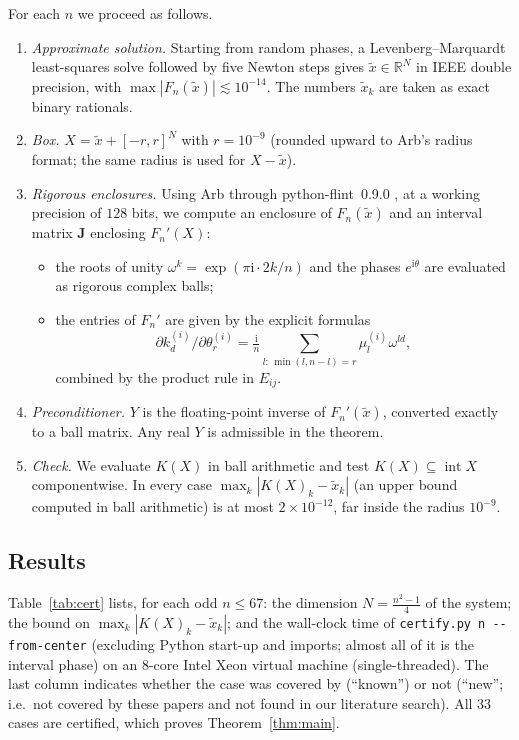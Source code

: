 \documentclass[11pt]{amsart}
\theoremstyle{definition}
\theoremstyle{remark}
\newcommand{\R}{\mathbb{R}}
\begin{document}
For each $n$ we proceed as follows.
\begin{enumerate}
\item \emph{Approximate solution.} Starting from random phases, a Levenberg--Marquardt least-squares solve followed by five Newton steps gives $\tilde x\in\R^N$ in IEEE double precision, with $\max|F_n(\tilde x)|\lesssim10^{-14}$. The numbers $\tilde x_k$ are taken as exact binary rationals.
\item \emph{Box.} $X=\tilde x+[-r,r]^N$ with $r=10^{-9}$ (rounded upward to Arb's radius format; the same radius is used for $X-\tilde x$).
\item \emph{Rigorous enclosures.} Using Arb \cite{Joh17} through python-flint~0.9.0 \cite{pyflint}, at a working precision of $128$ bits, we compute an enclosure of $F_n(\tilde x)$ and an interval matrix $\mathbf J$ enclosing $F_n'(X)$:
\begin{itemize}
\item the roots of unity $\omega^k=\exp(\pi\mathrm i\cdot 2k/n)$ and the phases $e^{\mathrm i\theta}$ are evaluated as rigorous complex balls;
\item the entries of $F_n'$ are given by the explicit formulas
\[\partial k^{(i)}_d/\partial\theta^{(i)}_r=\tfrac{\mathrm i}{n}\textstyle\sum_{l:\,\min(l,n-l)=r}\mu^{(i)}_l\omega^{ld},\]
combined by the product rule in $E_{ij}$.
\end{itemize}
\item \emph{Preconditioner.} $Y$ is the floating-point inverse of $F_n'(\tilde x)$, converted exactly to a ball matrix. Any real $Y$ is admissible in the theorem.
\item \emph{Check.} We evaluate $K(X)$ in ball arithmetic and test $K(X)\subseteq\operatorname{int}X$ componentwise. In every case $\max_k|K(X)_k-\tilde x_k|$ (an upper bound computed in ball arithmetic) is at most $2\times10^{-12}$, far inside the radius $10^{-9}$.
\end{enumerate}

\subsection{Results}
Table~\ref{tab:cert} lists, for each odd $n\le67$: the dimension $N=\frac{n^2-1}{4}$ of the system; the bound on $\max_k|K(X)_k-\tilde x_k|$; and the wall-clock time of \texttt{certify.py n -{}-from-center} (excluding Python start-up and imports; almost all of it is the interval phase) on an 8-core Intel Xeon virtual machine (single-threaded). The last column indicates whether the case was covered by \cite{GLL22,LR21} (``known'') or not (``new''; i.e.\ not covered by these papers and not found in our literature search). All $33$ cases are certified, which proves Theorem~\ref{thm:main}.
\end{document}
